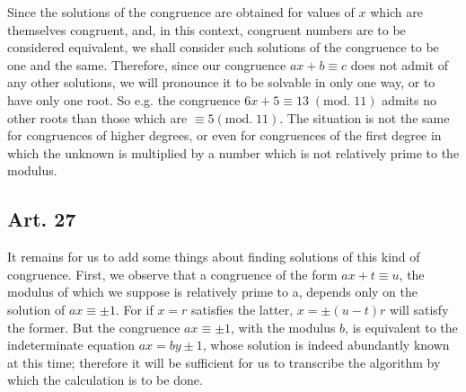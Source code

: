 \documentclass{book}
\theoremstyle{plain}
\theoremstyle{remark}
\begin{document}
Since the solutions of the congruence are obtained for values of $x$ which are themselves congruent, and, in this context, congruent numbers are to be considered equivalent, we shall consider such solutions of the congruence to be one and the same.  Therefore, since our congruence $ax+b\equiv c$ does not admit of any other solutions, we will pronounce it to be solvable in only one way, or to have only one root.   So e.g. the congruence $6x+5\equiv 13 \;(\mathrm{mod.} \;11)$ admits no other roots than those which are $\equiv 5 (\mathrm{mod.}\;11)$.  The situation is not the same for congruences of higher degrees, or even for congruences of the first degree in which the unknown is multiplied by a number which is not relatively prime to the modulus.

\subsection*{Art. 27}

It remains for us to add some things about finding solutions of this kind of congruence.  First, we observe that a congruence of the form $ax+t \equiv u$, the modulus of which we suppose is relatively prime to a, depends only on the solution of $ax \equiv \pm 1$.   For if $x=r$ satisfies the latter, $x = \pm (u-t)r$ will satisfy the former.   But the congruence $ax \equiv \pm 1$, with the modulus $b$, is equivalent to the indeterminate equation $ax = by \pm 1$, whose solution is indeed abundantly known at this time; therefore it will be sufficient for us to transcribe the algorithm by which the calculation is to be done.
\end{document}
